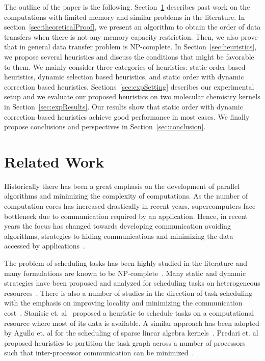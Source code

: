 \documentclass[sigconf]{acmart}
\begin{document}
	The outline of the paper is the following. Section~\ref{sec:relatedWork} describes past work on the computations with limited memory and similar problems in the literature. In section~\ref{sec:theoreticalProof}, we present an algorithm to obtain the order of data transfers when there is not any memory capacity restriction. Then, we also prove that in general data transfer problem is NP-complete. In Section~\ref{sec:heuristics}, we propose several heuristics and discuss the conditions that might be favorable to them. We mainly consider three categories of heuristics: static order based heuristics, dynamic selection based heuristics, and static order with dynamic correction based heuristics. Sections~\ref{sec:expSetting} describes our experimental setup and we evaluate our proposed heuristics on two molecular chemistry kernels in Section~\ref{sec:expResults}. Our results show that static order with dynamic correction based heuristics achieve good performance in most cases. We finally propose conclusions and perspectives in Section~\ref{sec:conclusion}.
	
	\section{Related Work}
	\label{sec:relatedWork}
	
	Historically there has been a great emphasis on the development of parallel algorithms and minimizing the complexity of computations. As the number of computation cores has increased drastically in recent years, supercomputers face bottleneck due to communication required by an application. Hence, in recent years the focus has changed towards developing communication avoiding algorithms, strategies to hiding communications and minimizing the data accessed by applications~\cite{yelick2016}. 
	
	
	The problem of scheduling tasks has been highly studied in the literature and many formulations are known to be NP-complete~\cite{GareyJohnson}. Many static and dynamic strategies have been proposed and analyzed for scheduling tasks on heterogeneous resources~\cite{heft-Topcuoglu,ipdps16starpu}. There is also a number of studies in the direction of task scheduling with the emphasis on improving locality and minimizing the communication cost~\cite{starpu,heft-Topcuoglu}. Stanisic et. al~\cite{luka-dmdar} proposed a heuristic to schedule tasks on a computational resource where most of its data is available. A similar approach has been adopted by Agullo et. al for the scheduling of sparse linear algebra kernels~\cite{agullo_fmm}. Predari et. al proposed heuristics to partition the task graph across a number of processors such that inter-processor communication can be minimized~\cite{predari:tel-01518956}.
	
\end{document}
